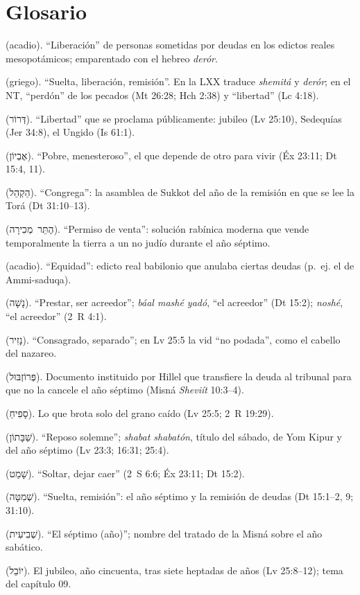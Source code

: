 \documentclass[11pt,letterpaper]{article}
\newcommand{\heb}[1]{\mbox{\foreignlanguage{hebrew}{#1}}}
\newcommand{\grc}[1]{\foreignlanguage{ancientgreek}{#1}}
\begin{document}
\section*{Glosario}
\begin{description}\small
\item[\emph{Andurārum}] (acadio). ``Liberación'' de personas sometidas por deudas en los edictos reales mesopotámicos; emparentado con el hebreo \emph{derór}.
\item[\grc{Ἄφεσις} (\emph{áphesis})] (griego). ``Suelta, liberación, remisión''. En la LXX traduce \emph{shemitá} y \emph{derór}; en el NT, ``perdón'' de los pecados (Mt 26:28; Hch 2:38) y ``libertad'' (Lc 4:18).
\item[\emph{Derór}] (\heb{דְּרוֹר}). ``Libertad'' que se proclama públicamente: jubileo (Lv 25:10), Sedequías (Jer 34:8), el Ungido (Is 61:1).
\item[\emph{Ebyón}] (\heb{אֶבְיוֹן}). ``Pobre, menesteroso'', el que depende de otro para vivir (Éx 23:11; Dt 15:4, 11).
\item[\emph{Haqhel}] (\heb{הַקְהֵל}). ``Congrega'': la asamblea de Sukkot del año de la remisión en que se lee la Torá (Dt 31:10--13).
\item[\emph{Heter mejirá}] (\heb{הֶתֵּר מְכִירָה}). ``Permiso de venta'': solución rabínica moderna que vende temporalmente la tierra a un no judío durante el año séptimo.
\item[\emph{Mīšarum}] (acadio). ``Equidad'': edicto real babilonio que anulaba ciertas deudas (p.~ej. el de Ammi-saduqa).
\item[\emph{Nashá}] (\heb{נָשָׁה}). ``Prestar, ser acreedor''; \emph{báal mashé yadó}, ``el acreedor'' (Dt 15:2); \emph{noshé}, ``el acreedor'' (2~R 4:1).
\item[\emph{Nazir}] (\heb{נָזִיר}). ``Consagrado, separado''; en Lv 25:5 la vid ``no podada'', como el cabello del nazareo.
\item[\emph{Prosbul}] (\heb{פְּרוֹזְבּוּל}). Documento instituido por Hillel que transfiere la deuda al tribunal para que no la cancele el año séptimo (Misná \emph{Sheviít} 10:3--4).
\item[\emph{Sefiaj}] (\heb{סָפִיחַ}). Lo que brota solo del grano caído (Lv 25:5; 2~R 19:29).
\item[\emph{Shabatón}] (\heb{שַׁבָּתוֹן}). ``Reposo solemne''; \emph{shabat shabatón}, título del sábado, de Yom Kipur y del año séptimo (Lv 23:3; 16:31; 25:4).
\item[\emph{Shamat}] (\heb{שָׁמַט}). ``Soltar, dejar caer'' (2~S 6:6; Éx 23:11; Dt 15:2).
\item[\emph{Shemitá}] (\heb{שְׁמִטָּה}). ``Suelta, remisión'': el año séptimo y la remisión de deudas (Dt 15:1--2, 9; 31:10).
\item[\emph{Sheviít}] (\heb{שְׁבִיעִית}). ``El séptimo (año)''; nombre del tratado de la Misná sobre el año sabático.
\item[\emph{Yovel}] (\heb{יוֹבֵל}). El jubileo, año cincuenta, tras siete heptadas de años (Lv 25:8--12); tema del capítulo 09.
\end{description}
\end{document}
